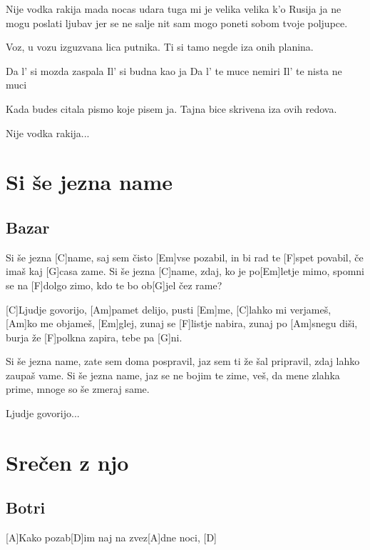 \documentclass[a4paper,12pt]{article}
\begin{document}
\begin{multicols}{2}
\begin{guitar}
Nije vodka rakija mada nocas udara
tuga mi je velika velika k'o Rusija
ja ne mogu poslati ljubav jer se ne salje
nit sam mogo poneti sobom tvoje poljupce.


Voz, u vozu izguzvana lica putnika.
Ti si tamo negde iza onih planina.


Da l' si mozda zaspala
Il' si budna kao ja
Da l' te muce nemiri
Il' te nista ne muci


Kada budes citala pismo koje pisem ja.
Tajna bice skrivena iza ovih redova.


Nije vodka rakija...

\end{guitar}
\section{Si še jezna name}
\subsection*{Bazar}
\begin{guitar}
[C]Si še jezna [C]name, 
saj sem čisto [Em]vse pozabil,
in bi rad te [F]spet povabil, 
če imaš kaj [G]casa zame.
Si še jezna [C]name, zdaj, 
ko je po[Em]letje mimo,
spomni se na [F]dolgo zimo, 
kdo te bo ob[G]jel čez rame?



[C]Ljudje govorijo, [Am]pamet delijo, pusti [Em]me, 
[C]lahko mi verjameš, [Am]ko me objameš, [Em]glej,
zunaj se [F]listje nabira, zunaj po [Am]snegu diši, 
burja že [F]polkna zapira, tebe pa [G]ni. 



Si še jezna name, 
zate sem doma pospravil,
jaz sem ti že šal pripravil, 
zdaj lahko zaupaš vame. 
Si še jezna name, 
jaz se ne bojim te zime,
veš, da mene zlahka prime, 
mnoge so še zmeraj same. 



Ljudje govorijo...

\end{guitar}
\section{Srečen z njo}
\subsection*{Botri}
\begin{guitar}
[D A]

[A]Kako pozab[D]im naj na zvez[A]dne  noci, [D]


\end{guitar}
\end{multicols}
\end{document}
